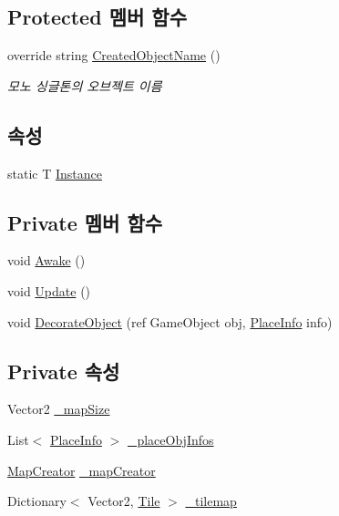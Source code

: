 \subsection*{Protected 멤버 함수}
\begin{DoxyCompactItemize}
\item 
override string \hyperlink{class_map_manager_aa3459a9fe2d748c6e9f2c3da8a6273cd}{Created\+Object\+Name} ()
\begin{DoxyCompactList}\small\item\em 모노 싱글톤의 오브젝트 이름 \end{DoxyCompactList}\end{DoxyCompactItemize}
\subsection*{속성}
\begin{DoxyCompactItemize}
\item 
static T \hyperlink{class_m_c_n_1_1_mono_singletone_aa50c027cca64cf4ad30c1ee5c83e0b78}{Instance}
\end{DoxyCompactItemize}
\subsection*{Private 멤버 함수}
\begin{DoxyCompactItemize}
\item 
void \hyperlink{class_map_manager_ad633984007048c7d63eab44aaeb0c32d}{Awake} ()
\item 
void \hyperlink{class_map_manager_aeaf61c0a498d98a5ac778db479353d77}{Update} ()
\item 
void \hyperlink{class_map_manager_a31c2b0b9cf8f208a596b65e7f1d88873}{Decorate\+Object} (ref Game\+Object obj, \hyperlink{class_m_c_n_1_1_place_info}{Place\+Info} info)
\end{DoxyCompactItemize}
\subsection*{Private 속성}
\begin{DoxyCompactItemize}
\item 
Vector2 \hyperlink{class_map_manager_a960f398cc92f569f620ddc8c0140a5c7}{\+\_\+map\+Size}
\item 
List$<$ \hyperlink{class_m_c_n_1_1_place_info}{Place\+Info} $>$ \hyperlink{class_map_manager_ab581d2c754246f74999a0b744ba2b14f}{\+\_\+place\+Obj\+Infos}
\item 
\hyperlink{class_map_creator}{Map\+Creator} \hyperlink{class_map_manager_aa837a852f355a33b263c1bb07c6c4ece}{\+\_\+map\+Creator}
\item 
Dictionary$<$ Vector2, \hyperlink{class_tile}{Tile} $>$ \hyperlink{class_map_manager_a58f7635d8e19795f3845a3f85e2b4ac3}{\+\_\+tilemap}
\end{DoxyCompactItemize}


